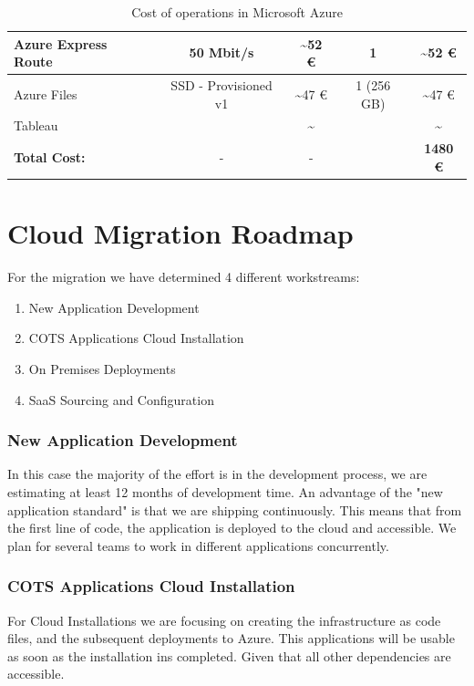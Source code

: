 \documentclass{llncs}
\begin{document}
\begin{table}[htbp]
\begin{tabular}{|l|c|c|c|c|}
        \hline
        Azure Express Route          & 50 Mbit/s             & \textasciitilde 52 €                 & 1                 & \textasciitilde 52 €                \\
        \hline
        Azure Files                  & SSD - Provisioned v1  & \textasciitilde 47 €                 & 1 (256 GB)        & \textasciitilde 47 €                \\
        \hline
        Tableau                      &                       & \textasciitilde                      &                   & \textasciitilde                     \\
        \hline
        \textbf{Total Cost:}         & -                     & -                                    &                   & \textbf{1480  €}                    \\
        \hline
    \end{tabular}
    \caption{Cost of operations in Microsoft Azure}
    \label{tab:Cost_Operation_Monthly}
\end{table}


\section{Cloud Migration Roadmap}

For the migration we have determined 4 different workstreams:
\begin{enumerate}
    \item New Application Development
    \item COTS Applications Cloud Installation
    \item On Premises Deployments
    \item SaaS Sourcing and Configuration
\end{enumerate}

\subsubsection{New Application Development}
In this case the majority of the effort is in the development process, we are estimating at least 12 months of development time. An advantage of the "new application standard" is that we are shipping continuously.
This means that from the first line of code, the application is deployed to the cloud and accessible. We plan for several teams to work in different applications concurrently.

\subsubsection{COTS Applications Cloud Installation}
For Cloud Installations we are focusing on creating the infrastructure as code files, and the subsequent deployments to Azure. This applications will be usable as soon as the installation ins completed. Given that all other dependencies are accessible.
\end{document}
